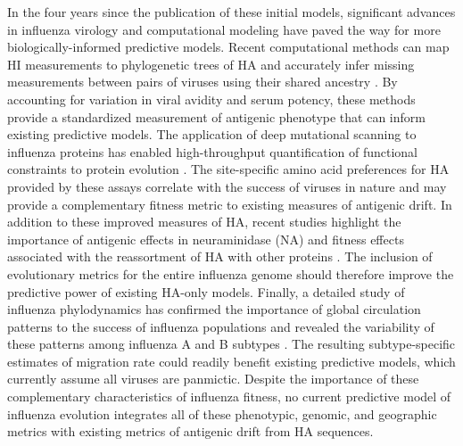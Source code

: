 In the four years since the publication of these initial models, significant advances in influenza virology and computational modeling have paved the way for more biologically-informed predictive models.
Recent computational methods can map HI measurements to phylogenetic trees of HA and accurately infer missing measurements between pairs of viruses using their shared ancestry \cite{Neher:2016hy}.
By accounting for variation in viral avidity and serum potency, these methods provide a standardized measurement of antigenic phenotype that can inform existing predictive models.
The application of deep mutational scanning to influenza proteins has enabled high-throughput quantification of functional constraints to protein evolution \cite{Thyagarajan:2014go,Wu:2014ii,Doud:2016gm}.
The site-specific amino acid preferences for HA provided by these assays correlate with the success of viruses in nature \cite{Lee2018} and may provide a complementary fitness metric to existing measures of antigenic drift.
In addition to these improved measures of HA, recent studies highlight the importance of antigenic effects in neuraminidase (NA) \cite{Chen:2018kp} and fitness effects associated with the reassortment of HA with other proteins \cite{Villa:2017iw}.
The inclusion of evolutionary metrics for the entire influenza genome should therefore improve the predictive power of existing HA-only models.
Finally, a detailed study of influenza phylodynamics has confirmed the importance of global circulation patterns to the success of influenza populations and revealed the variability of these patterns among influenza A and B subtypes \cite{Bedford:2015fj}.
The resulting subtype-specific estimates of migration rate could readily benefit existing predictive models, which currently assume all viruses are panmictic.
Despite the importance of these complementary characteristics of influenza fitness, no current predictive model of influenza evolution integrates all of these phenotypic, genomic, and geographic metrics with existing metrics of antigenic drift from HA sequences.


